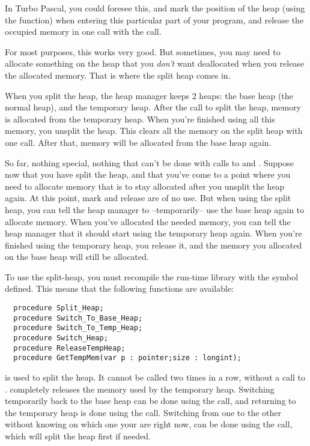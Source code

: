 In Turbo Pascal, you could foresee this, and mark the position of the heap
(using the  function) when entering this particular part of your
program, and release the occupied memory in one call with the 
call.

For most purposes, this works very good. But sometimes, you may need to
allocate something on the heap that you {\em don't} want deallocated when you
release the allocated memory. That is where the split heap comes in.

When you split the heap, the heap manager keeps 2 heaps: the base heap (the
normal heap), and the temporary heap. After the call to split the heap,
memory is allocated from the temporary heap. When you're finished using all
this memory, you unsplit the heap. This clears all the memory on the split
heap with one call. After that, memory will be allocated from the base heap
again.

So far, nothing special, nothing that can't be done with calls to 
and . Suppose now that you have split the heap, and that you've
come to a point where you need to allocate memory that is to stay allocated
after you unsplit the heap again. At this point, mark and release are of no
use. But when using the split heap, you can tell the heap manager to
--temporarily-- use the base heap again to allocate memory.
When you've allocated the needed memory, you can tell the heap manager that
it should start using the temporary heap again.
When you're finished using the temporary heap, you release it, and the
memory you allocated on the base heap will still be allocated.

To use the split-heap, you must recompile the run-time library with the 
symbol defined.
This means that the following functions are available:
\begin{verbatim}
  procedure Split_Heap;
  procedure Switch_To_Base_Heap;
  procedure Switch_To_Temp_Heap;
  procedure Switch_Heap;
  procedure ReleaseTempHeap;
  procedure GetTempMem(var p : pointer;size : longint);
\end{verbatim}
 is used to split the heap. It cannot be called two times
in a row, without a call to . 
completely releases the memory used by the temporary heap.
Switching temporarily back to the base heap can be done using the
 call, and returning to the temporary heap is done
using the  call. Switching from one to the other
without knowing on which one your are right now, can be done using the
 call, which will split the heap first if needed.


